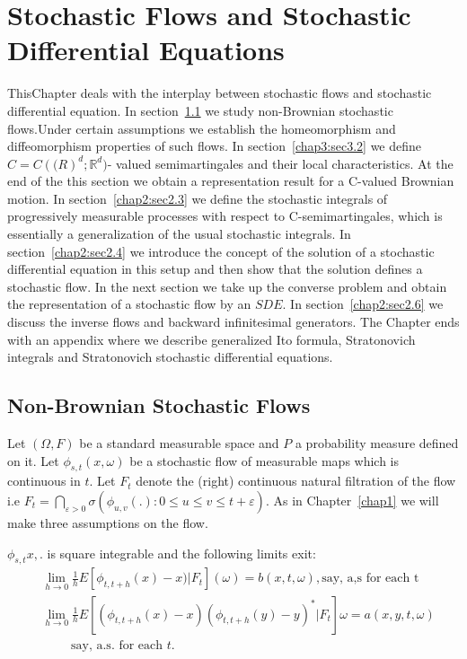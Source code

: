 \chapter{Stochastic Flows and Stochastic 
Differential Equations}\label{chap2}%

This\pageoriginale Chapter deals with the interplay between stochastic flows and
stoc\-hastic differential equation. In section~\ref{chap2:sec2.1} we study
non-Brownian stoc\-hastic flows.Under certain assumptions we establish
the homeomor\-phi\-sm and diffeomorphism properties of such flows. In
section~\ref{chap3:sec3.2} we define $C = C (\mathbb(R)^d ; \mathbb{R}^d)$- valued
semimartingales and their local characteristics. At the end of the
this section we  obtain a representation result for a C-valued Brownian
motion. In section~\ref{chap2:sec2.3} we define the stochastic integrals of
progressively measurable processes with respect to C-semimartingales,
which is essentially a generalization of the usual stochastic
integrals. In section~\ref{chap2:sec2.4} we introduce the concept of the solution
of a stochastic differential equation in this setup and then show that
the solution defines a stochastic flow. In the next section we take up
the converse problem and obtain the representation of a stochastic
flow by an $SDE$. In section~\ref{chap2:sec2.6} we discuss the inverse flows and
backward infinitesimal generators. The Chapter ends with an appendix
where we describe generalized Ito formula, Stratonovich integrals and
Stratonovich stochastic differential equations. 


\section{Non-Brownian Stochastic Flows}\label{chap2:sec2.1}%

Let $(\Omega, F)$ be a standard measurable space and $P$ a probability
measure defined on it. Let $\phi_{s,t}(x,\omega)$ be a stochastic
flow of measurable maps which is continuous in $t$. Let $F_t$ denote
the (right) continuous natural filtration of the flow i.e $F_t =
\bigcap_{\varepsilon >0}   \sigma (\phi_{u,v}(.): 0 \le  u \le v\le t +
\varepsilon)$. As in Chapter~\ref{chap1} we will make  three 
assumptions on the flow. 
\setcounter{Assumption}{0}
\begin{Assumption}\label{chap2:asm1}%
  $\phi_{s,t}{{x,.}}$ is square integrable and the following limits
  \break exit:
  \begin{align*}
    & \lim_{h \to 0} \frac{1}{h} E [\phi_{t,t+h}{{(x)-x)}}| F_t]
    (\omega) = b (x,t,\omega), \text{say, a,s for each t}\\ 
    & \lim_{h \to 0} \frac{1}{h} E [(\phi_{t,t+h}(x)-x)
      (\phi_{t,t+h}(y)-y)^* | F_t] \omega = a (x,y,t,\omega) \\ 
    & \qquad \text{ say, a.s. for each $t$}.
  \end{align*}\pageoriginale
\end{Assumption}


